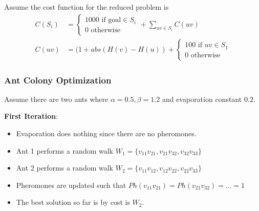 \documentclass[conference]{IEEEtran}
\begin{document}
Assume the cost function for the reduced problem is
\begin{equation} \label{eq:costreduced}
\begin{split}
C(S_i) &= \begin{cases} 1000 \text{ if goal} \in S_i \\ 0 \text{ otherwise} \end{cases} + \sum_{uv \in S_i} C(uv) \\
C(uv) &= (1 + abs(H(v) - H(u)) + \begin{cases} 100 \text{ if } uv \in S_1 \\ 0 \text{ otherwise} \end{cases}
\end{split}
\end{equation}

\subsubsection{Ant Colony Optimization}
Assume there are two ants where $\alpha = 0.5, \beta = 1.2$ and evaporation constant $0.2$.

\textbf{First Iteration}:
\begin{itemize}
\item Evaporation does nothing since there are no pheromones.
\item Ant 1 performs a random walk $W_1 = \{ v_{11}v_{21}, v_{21}v_{32}, v_{32}v_{33} \}$
\item Ant 2 performs a random walk $W_2 = \{ v_{11}v_{12}, v_{12}v_{22}, v_{22}v_{33} \}$
\item Pheromones are updated such that $Ph(v_{11}v_{21}) = Ph(v_{21}v_{32}) = ... = 1$
\item The best solution so far is by cost is $W_2$.
\end{itemize}
\end{document}

